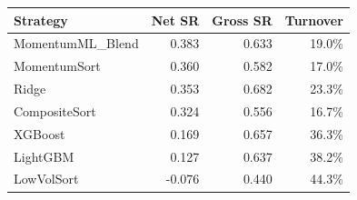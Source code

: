 \begin{tabular}{lrrr}
\toprule
Strategy & Net SR & Gross SR & Turnover \\
\midrule
MomentumML\_Blend & 0.383 & 0.633 & 19.0\% \\
MomentumSort & 0.360 & 0.582 & 17.0\% \\
Ridge & 0.353 & 0.682 & 23.3\% \\
CompositeSort & 0.324 & 0.556 & 16.7\% \\
XGBoost & 0.169 & 0.657 & 36.3\% \\
LightGBM & 0.127 & 0.637 & 38.2\% \\
LowVolSort & -0.076 & 0.440 & 44.3\% \\
\bottomrule
\end{tabular}
